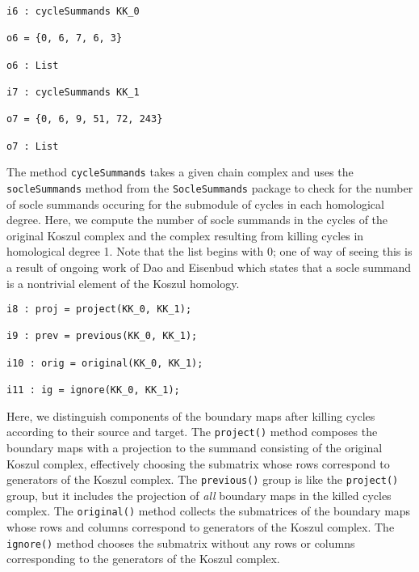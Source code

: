 \documentclass[twoside,12pt, leqno]{amsart}
\begin{document}
\begin{footnotesize}
\begin{verbatim}
i6 : cycleSummands KK_0

o6 = {0, 6, 7, 6, 3}

o6 : List

i7 : cycleSummands KK_1

o7 = {0, 6, 9, 51, 72, 243}

o7 : List
\end{verbatim}
\end{footnotesize}

The method \texttt{cycleSummands} takes a given chain complex and uses the \texttt{socleSummands} method from the \texttt{SocleSummands} package to check for the number of socle summands occuring for the submodule of cycles in each homological degree. Here, we compute the number of socle summands in the cycles of the original Koszul complex and the complex resulting from killing cycles in homological degree 1. Note that the list begins with 0; one of way of seeing this is a result of ongoing work of Dao and Eisenbud which states that a socle summand is a nontrivial element of the Koszul homology.

\begin{footnotesize}
\begin{verbatim}
i8 : proj = project(KK_0, KK_1);

i9 : prev = previous(KK_0, KK_1);

i10 : orig = original(KK_0, KK_1);

i11 : ig = ignore(KK_0, KK_1);
\end{verbatim}
\end{footnotesize}

Here, we distinguish components of the boundary maps after killing cycles according to their source and target. The \texttt{project()} method composes the boundary maps with a projection to the summand consisting of the original Koszul complex, effectively choosing the submatrix whose rows correspond to generators of the Koszul complex. The \texttt{previous()} group is like the \texttt{project()} group, but it includes the projection of \textit{all} boundary maps in the killed cycles complex. The \texttt{original()} method collects the submatrices of the boundary maps whose rows and columns correspond to generators of the Koszul complex. The \texttt{ignore()} method chooses the submatrix without any rows or columns corresponding to the generators of the Koszul complex.
\end{document}
